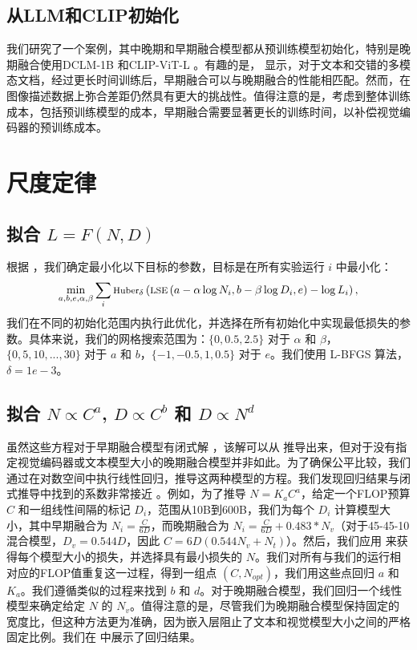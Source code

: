 \subsection{从LLM和CLIP初始化}
\label{sec:app_init_early_late}

我们研究了一个案例，其中晚期和早期融合模型都从预训练模型初始化，特别是晚期融合使用DCLM-1B \citep{li2024datacomp}和CLIP-ViT-L \citep{radford2021learning}。有趣的是， 显示，对于文本和交错的多模态文档，经过更长时间训练后，早期融合可以与晚期融合的性能相匹配。然而，在图像描述数据上弥合差距仍然具有更大的挑战性。值得注意的是，考虑到整体训练成本，包括预训练模型的成本，早期融合需要显著更长的训练时间，以补偿视觉编码器的预训练成本。


\section{尺度定律}
\label{app:scaling_laws}

\subsection{拟合 \(L = F(N, D)\)}
根据 \citep{hoffmann2022training}，我们确定最小化以下目标的参数，目标是在所有实验运行 \(i\) 中最小化：
\begin{equation}
\footnotesize
    \min_{a,b,e,\alpha,\beta} \sum_{i} \text{Huber}_\delta \left( \text{LSE} \left( a - \alpha \log N_i, b - \beta \log D_i, e \right) - \log L_i \right),
\end{equation}
我们在不同的初始化范围内执行此优化，并选择在所有初始化中实现最低损失的参数。具体来说，我们的网格搜索范围为：\(\{0, 0.5, 2.5\}\) 对于 \(\alpha\) 和 \(\beta\)，\(\{0, 5, 10, ..., 30\}\) 对于 \(a\) 和 \(b\)，\(\{-1, -0.5, 1, 0.5\}\) 对于 \(e\)。我们使用 L-BFGS 算法，\(\delta=1e-3\)。
\subsection{拟合 \(N \propto C^a\), \(D \propto C^b\) 和 \(D \propto N^d\)}
虽然这些方程对于早期融合模型有闭式解 \citep{hoffmann2022training}，该解可以从  推导出来，但对于没有指定视觉编码器或文本模型大小的晚期融合模型并非如此。为了确保公平比较，我们通过在对数空间中执行线性回归，推导这两种模型的方程。我们发现回归结果与闭式推导中找到的系数非常接近 。例如，为了推导 \(N = K_aC^a\)，给定一个FLOP预算 \(C\) 和一组线性间隔的标记 \(D_i\)，范围从10B到600B，我们为每个 \(D_i\) 计算模型大小，其中早期融合为 \(N_i = \frac{C}{6D}\)，而晚期融合为 \(N_i = \frac{C}{6D}+0.483*N_v\)（对于45-45-10混合模型，\(D_v=0.544D\)，因此 \(C=6D(0.544N_v+N_t)\)）。然后，我们应用  来获得每个模型大小的损失，并选择具有最小损失的 \(N\)。我们对所有与我们的运行相对应的FLOP值重复这一过程，得到一组点 \((C, N_{opt})\)，我们用这些点回归 \(a\) 和 \(K_a\)。我们遵循类似的过程来找到 \(b\) 和 \(d\)。对于晚期融合模型，我们回归一个线性模型来确定给定 \(N\) 的 \(N_v\)。值得注意的是，尽管我们为晚期融合模型保持固定的宽度比，但这种方法更为准确，因为嵌入层阻止了文本和视觉模型大小之间的严格固定比例。我们在  中展示了回归结果。

